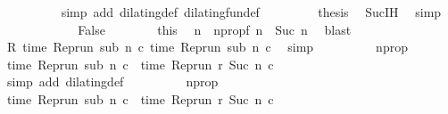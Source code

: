 \begin{isabellebody}
\ \ \ \ \ \ \ \ \isamarkupfalse%
\ {\isacharparenleft}simp\ add{\isacharcolon}\ dilating{\isacharunderscore}def\ dilating{\isacharunderscore}fun{\isacharunderscore}def{\isacharparenright}\ \isanewline
\ \ \ \ \ \ \isamarkupfalse%
\ {\isacharquery}thesis\ \isamarkupfalse%
\ Suc{\isachardot}IH\ \isamarkupfalse%
\ simp\isanewline
\ \ \ \ \isamarkupfalse%
\isanewline
\ \ \ \ \ \ \isamarkupfalse%
\ False\isanewline
\ \ \ \ \ \ \isamarkupfalse%
\ this\ \isamarkupfalse%
\ n\ \ nprop{\isacharcolon}{\isacartoucheopen}f\ n\ {\isacharequal}\ Suc\ n{\isacartoucheclose}\ \isamarkupfalse%
\ blast\isanewline
\ \ \ \ \ \ \isamarkupfalse%
\ {}\ \isamarkupfalse%
\ {\isacartoucheopen}R\ {\isacharparenleft}time\ {\isacharparenleft}{\isacharparenleft}Rep{\isacharunderscore}run\ sub{\isacharparenright}\ n\ c\ time\ {\isacharparenleft}{\isacharparenleft}Rep{\isacharunderscore}run\ sub{\isacharparenright}\ n\ c\ \isamarkupfalse%
\ simp\isanewline
\ \ \ \ \ \ \isamarkupfalse%
\ \isamarkupfalse%
\ nprop\ {\isacharasterisk}\ \isamarkupfalse%
\ {\isacartoucheopen}time\ {\isacharparenleft}{\isacharparenleft}Rep{\isacharunderscore}run\ sub{\isacharparenright}\ n\ c\ {\isacharequal}\ time\ {\isacharparenleft}{\isacharparenleft}Rep{\isacharunderscore}run\ r{\isacharparenright}\ {\isacharparenleft}Suc\ n{\isacharparenright}\ c\isanewline
\ \ \ \ \ \ \ \ \isamarkupfalse%
\ {\isacharparenleft}simp\ add{\isacharcolon}\ dilating{\isacharunderscore}def{\isacharparenright}\isanewline
\ \ \ \ \ \ \isamarkupfalse%
\ \isamarkupfalse%
\ nprop\ {\isacharasterisk}\ \isamarkupfalse%
\ {\isacartoucheopen}time\ {\isacharparenleft}{\isacharparenleft}Rep{\isacharunderscore}run\ sub{\isacharparenright}\ n\ c\ {\isacharequal}\ time\ {\isacharparenleft}{\isacharparenleft}Rep{\isacharunderscore}run\ r{\isacharparenright}\ {\isacharparenleft}Suc\ n{\isacharparenright}\ c\isanewline

\end{isabellebody}
